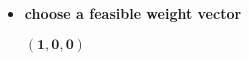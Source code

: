\documentclass[blockverticalspace=3cm]{tikzposter}
\begin{document}
\begin{columns}
{\begin{itemize}
				\item \textbf{choose a feasible weight vector}\\
				\centerline{\color{red}$\mathbf{(1,0,0)}$}
			\end{itemize}
			}
		
\end{columns}
\end{document}
